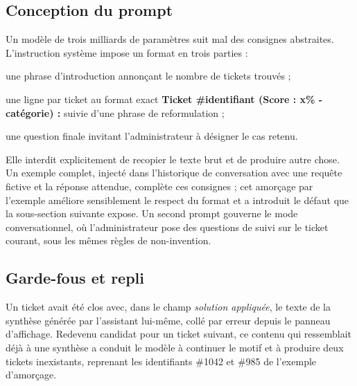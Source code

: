 \subsection{Conception du prompt}

Un modèle de trois milliards de paramètres suit mal des consignes abstraites. L'instruction système
impose un format en trois parties :

\begin{puces}
  \item une phrase d'introduction annonçant le nombre de tickets trouvés ;
  \item une ligne par ticket au format exact \og \textbf{Ticket \#identifiant (Score : x\%
        - catégorie) :} \fg{} suivie d'une phrase de reformulation ;
  \item une question finale invitant l'administrateur à désigner le cas retenu.
\end{puces}

Elle interdit explicitement de recopier le texte brut et de produire autre chose. Un exemple
complet, injecté dans l'historique de conversation avec une requête fictive et la réponse attendue,
complète ces consignes ; cet amorçage par l'exemple améliore sensiblement le respect du format et a
introduit le défaut que la sous-section suivante expose. Un second prompt gouverne le mode
conversationnel, où l'administrateur pose des questions de suivi sur le ticket courant, sous les
mêmes règles de non-invention.

\subsection{Garde-fous et repli}

Un ticket avait été clos avec, dans le champ \emph{solution appliquée}, le texte de la synthèse
générée par l'assistant lui-même, collé par erreur depuis le panneau d'affichage. Redevenu candidat
pour un ticket suivant, ce contenu qui ressemblait déjà à une synthèse a conduit le modèle à
continuer le motif et à produire deux tickets inexistants, reprenant les identifiants \#1042 et
\#985 de l'exemple d'amorçage.

